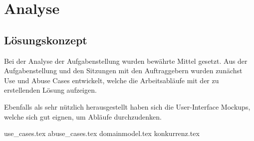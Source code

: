 \chapter{Analyse}
\section{Lösungskonzept}

Bei der Analyse der Aufgabenstellung wurden bewährte Mittel gesetzt. Aus der Aufgabenstellung und den Sitzungen mit den Auftraggebern wurden zunächst Use und Abuse Cases entwickelt, welche die Arbeitsabläufe mit der zu erstellenden Lösung aufzeigen.

Ebenfalls als sehr nützlich herausgestellt haben sich die User-Interface Mockups, welche sich gut eignen, um Abläufe durchzudenken.


\clearpage
{use_cases.tex}
\clearpage
{abuse_cases.tex}
\clearpage
{domainmodel.tex}
\clearpage
{konkurrenz.tex}

